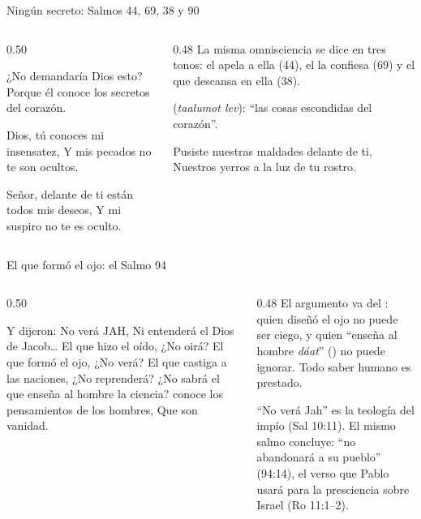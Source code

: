 \begin{frame}{Ningún secreto: Salmos 44, 69, 38 y 90}
\begin{columns}[t,onlytextwidth]
\begin{column}{0.50\textwidth}
\begin{cita}¿No demandaría Dios esto? Porque él conoce los secretos del corazón.\end{cita}
\begin{cita}Dios, tú conoces mi insensatez, Y mis pecados no te son ocultos.\end{cita}
\begin{cita}Señor, delante de ti están todos mis deseos, Y mi suspiro no te es oculto.\end{cita}
\end{column}
\begin{column}{0.48\textwidth}\small
La misma omnisciencia se dice en tres tonos: el  apela a ella (44), el  la confiesa (69) y el que  descansa en ella (38).\par\medskip
\scriptsize{} (\emph{taalumot lev}): ``las cosas escondidas del corazón''.\par\medskip
\begin{cita}Pusiste nuestras maldades delante de ti, Nuestros yerros a la luz de tu rostro.\end{cita}
\end{column}
\end{columns}
\end{frame}

\begin{frame}{El que formó el ojo: el Salmo 94}
\begin{columns}[t,onlytextwidth]
\begin{column}{0.50\textwidth}
\begin{cita}Y dijeron: No verá JAH, Ni entenderá el Dios de Jacob\ldots{} El que hizo el oído, ¿No oirá? El que formó el ojo, ¿No verá? El que castiga a las naciones, ¿No reprenderá? ¿No sabrá el que enseña al hombre la ciencia? \SENOR{} conoce los pensamientos de los hombres, Que son vanidad.\end{cita}
\end{column}
\begin{column}{0.48\textwidth}\small
El argumento va del : quien diseñó el ojo no puede ser ciego, y quien ``enseña al hombre \emph{dáat}'' () no puede ignorar. Todo saber humano es prestado.\par\medskip
``No verá Jah'' es la teología del impío (Sal 10:11). El mismo salmo concluye: ``no abandonará \SENOR{} a su pueblo'' (94:14), el verso que Pablo usará para la presciencia sobre Israel (Ro 11:1--2).
\end{column}
\end{columns}
\end{frame}

